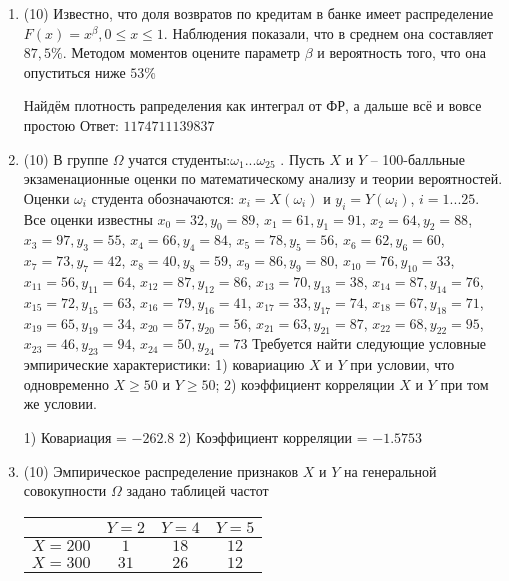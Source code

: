 \documentclass[a4paper,12pt]{article}
\begin{document}
\begin{enumerate}
\item


(10) Известно, что доля возвратов по кредитам в банке имеет распределение $F(x) = x ^{\beta}, 0 \leqslant x \leqslant 1$.
Наблюдения показали, что в среднем она составляет $87,5\%$. Методом моментов оцените параметр $\beta$ и
вероятность того, что она опуститься ниже $53\%$




Найдём плотность рапределения как интеграл от ФР, а дальше всё и вовсе простою Ответ: $1174711139837$


\item


(10) В группе $\Omega$ учатся студенты:$\omega _{1}...\omega _{25}$ . Пусть $X$ и $Y$ – 100-балльные экзаменационные оценки по
математическому анализу и теории вероятностей. Оценки $\omega _{i}$ студента обозначаются: $x _{i} = X(\omega _{i})$ и $y _{i} = Y(\omega _{i})$, $i = 1...25$. Все оценки известны
$x _{0} = 32, y _{0} = 89$, $x _{1} = 61, y _{1} = 91$, $x _{2} = 64, y _{2} = 88$, $x _{3} = 97, y _{3} = 55$, $x _{4} = 66, y _{4} = 84$, $x _{5} = 78, y _{5} = 56$, $x _{6} = 62, y _{6} = 60$, $x _{7} = 73, y _{7} = 42$, $x _{8} = 40, y _{8} = 59$, $x _{9} = 86, y _{9} = 80$, $x _{10} = 76, y _{10} = 33$, $x _{11} = 56, y _{11} = 64$, $x _{12} = 87, y _{12} = 86$, $x _{13} = 70, y _{13} = 38$, $x _{14} = 87, y _{14} = 76$, $x _{15} = 72, y _{15} = 63$, $x _{16} = 79, y _{16} = 41$, $x _{17} = 33, y _{17} = 74$, $x _{18} = 67, y _{18} = 71$, $x _{19} = 65, y _{19} = 34$, $x _{20} = 57, y _{20} = 56$, $x _{21} = 63, y _{21} = 87$, $x _{22} = 68, y _{22} = 95$, $x _{23} = 46, y _{23} = 94$, $x _{24} = 50, y _{24} = 73$
Требуется
найти следующие условные эмпирические характеристики: 1) ковариацию $X$ и $Y$ при условии, что одновременно $X \geqslant 50$
 и $Y \geqslant 50$; 2) коэффициент корреляции $X$ и $Y$ при том же условии.




1) Ковариация = $-262.8$
2) Коэффициент корреляции = $-1.5753$


\item


(10) Эмпирическое распределение признаков $X$ и $Y$ на генеральной совокупности $\Omega$ задано таблицей частот  
 
\begin{tabular}{ | c | c | c | c | }
\hline
 & $Y = 2$ & $Y = 4$ & $Y = 5$  \\ \hline
$X = 200$ & $1$ & $18$ & $12$\\ \hline
$X = 300$ & $31$ & $26$ & $12$\\
\hline
\end{tabular}


\end{enumerate}
\end{document}
